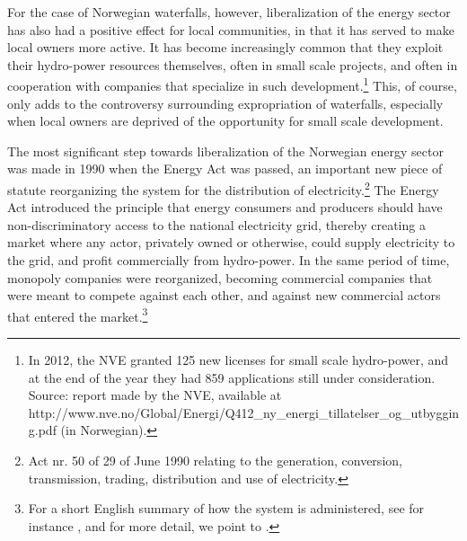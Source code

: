 For the case of Norwegian waterfalls, however, liberalization of the energy sector has also had a positive effect for local communities, in that it has served to make local owners more active. It has become increasingly common that they exploit their hydro-power resources themselves, often in small scale projects, and often in cooperation with companies that specialize in such development.\footnote{In 2012, the NVE granted 125 new licenses for small scale hydro-power, and at the end of the year they had 859 applications still under consideration. Source: report made by the NVE, available at http://www.nve.no/Global/Energi/Q412\_ny\_energi\_tillatelser\_og\_utbygging.pdf (in Norwegian). } This, of course, only adds to the controversy surrounding expropriation of waterfalls, especially when local owners are deprived of the opportunity for small scale development.

The most significant step towards liberalization of the Norwegian energy sector was made in 1990 when the Energy Act was passed, an important new piece of statute reorganizing the system for the distribution of electricity.\footnote{Act nr. 50 of 29 of June 1990 relating to the generation, conversion, transmission, trading, distribution and use of electricity.} The Energy Act introduced the principle that energy consumers and producers should have non-discriminatory access to the national electricity grid, thereby creating a market where any actor, privately owned or otherwise, could supply electricity to the grid, and profit commercially from hydro-power. In the same period of time, monopoly companies were reorganized, becoming commercial companies that were meant to compete against each other, and against new commercial actors that entered the market.\footnote{For a short English summary of how the system is administered, see for instance \cite[p.29-30]{ar2010}, and for more detail, we point to \cite{Hammer2}.}

